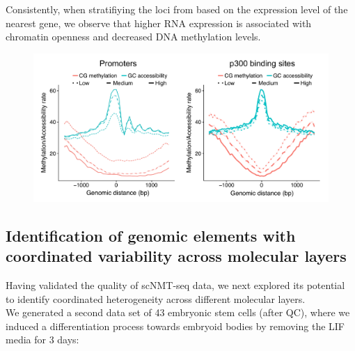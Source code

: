 Consistently, when stratifiying the loci from  based on the expression level of the nearest gene, we observe that higher RNA expression is associated with chromatin openness and decreased DNA methylation levels. 
\begin{figure}[H]
	\centering
	\includegraphics[width=1.0\linewidth]{scNMT_pseudobulk_profiles_byexpr}
	\caption[]{}
	\label{fig:scnmt_pseudobulk_profiles_byexpr}
\end{figure}



\subsection{Identification of genomic elements with coordinated variability across molecular layers}

Having validated the quality of scNMT-seq data, we next explored its potential to identify coordinated heterogeneity across different molecular layers.\\
We generated a second data set of 43 embryonic stem cells (after QC), where we induced a differentiation process towards embryoid bodies by removing the LIF media for 3 days:

